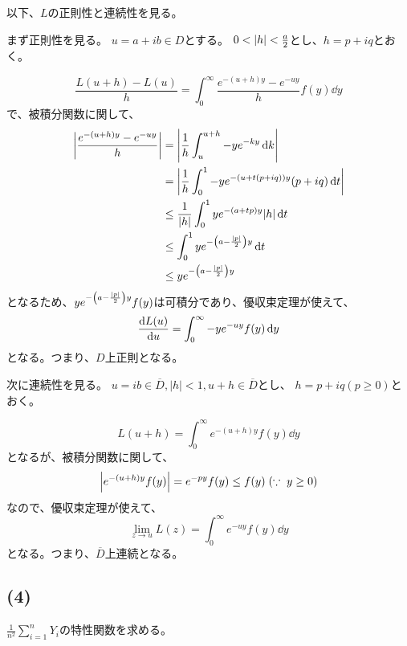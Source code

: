 \documentclass[a4paper, 10pt, dvipdfmx]{jlreq}
\begin{document}
以下、$L$の正則性と連続性を見る。

まず正則性を見る。
$u=a+ib \in D$とする。
$0<\abs{h}<\frac{a}{2}$とし、$h=p+iq$とおく。

\begin{equation*}
  \frac{L(u+h)-L(u)}{h}=\int_0^\infty \frac{e^{-(u+h)y}-e^{-uy}}{h} f(y) \dd{y}
\end{equation*}
で、被積分関数に関して、
\begin{align*}
  \abs{\frac{e^{-(u+h)y}-e^{-uy}}{h}} & = \abs{\frac{1}{h}\int_u^{u+h} -y e^{-ky} \dd{k}}                  \\
                                      & = \abs{\frac{1}{h}\int_0^1 -y e^{-\qty(u+t(p+iq))y} (p+iq) \dd{t}} \\
                                      & \leq \frac{1}{\abs{h}}\int_0^1 y e^{-\qty(a+tp)y} \abs{h} \dd{t}   \\
                                      & \leq \int_0^1 y e^{-\qty(a-\frac{\abs{p}}{2})y} \dd{t}             \\
                                      & \leq y e^{-\qty(a-\frac{\abs{p}}{2})y}
\end{align*}
となるため、$y e^{-\qty(a-\frac{\abs{p}}{2})y} f(y)$は可積分であり、優収束定理が使えて、
\begin{equation*}
  \dv{L(u)}{u} =\int_0^{\infty}  {-y e^{-uy}f(y)} \dd{y}
\end{equation*}
となる。つまり、$D$上正則となる。

次に連続性を見る。
$u=ib \in \overline{D}, |h|<1,u+h \in \overline{D}$とし、
$h=p+iq (p \geq 0)$とおく。

\begin{equation*}
  L(u+h)=\int_0^{\infty} e^{-(u+h)y}f(y)\dd{y}
\end{equation*}
となるが、被積分関数に関して、
\begin{equation*}
  \abs{e^{-(u+h)y}f(y)}=e^{-py}f(y) \leq f(y) \; (\because \; y \geq 0)
\end{equation*}
なので、優収束定理が使えて、
\begin{equation*}
  \lim_{z \to u}L(z)=\int_0^\infty e^{-uy}f(y) \dd{y}
\end{equation*}
となる。つまり、$\overline{D}$上連続となる。

\subsection*{(4)}

$\frac{1}{n^2}\sum_{i=1}^n{Y_i}$の特性関数を求める。
\end{document}
